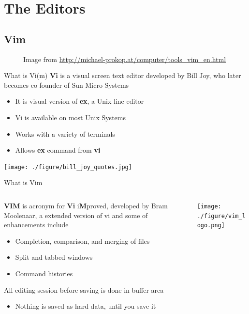 \documentclass[newPxFont,sthlmFooter,nooffset]{beamer}
\begin{document}
\section{The Editors}
\subsection{Vim}
\begin{frame}[t]{}
\begin{figure}\centering
   {\centering Image from \url{http://michael-prokop.at/computer/tools_vim_en.html}}
\end{figure}
\end{frame}

\begin{frame}[t]{What is Vi(m)}
\textbf{Vi} is a visual screen text editor developed by Bill Joy, who later becomes co-founder of Sun Micro Systems
\begin{itemize}
\item It is visual version of \textbf{ex}, a Unix line editor
\item Vi is available on most Unix Systems
\item Works with a variety of terminals
\item Allows \textbf{ex} command from \textbf{vi}
\end{itemize}
\bigskip

\begin{center}
 \texttt{[image: ./figure/bill\_joy\_quotes.jpg]}
\end{center}
\end{frame}


\begin{frame}[t]{What is Vim}
\begin{columns}
\begin{column}{0.8\linewidth}
\textbf{VIM} is acronym for \textbf{Vi} i\textbf{M}proved, developed by Bram Moolenaar, a extended version of vi and some of enhancements include
\begin{itemize}
\item Completion, comparison, and merging of files
\item Split and tabbed windows
\item Command histories
\end{itemize}
\bigskip
All editing session before saving is done in buffer area
\begin{itemize}
\item Nothing is saved as hard data, until you save it
\end{itemize}
\end{column}
\begin{column}{0.2\linewidth}
  \texttt{[image: ./figure/vim\_logo.png]}
\end{column}
\end{columns}
\end{frame}
\end{document}
